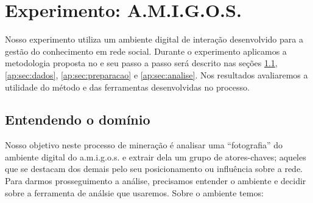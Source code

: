 \chapter{Experimento: A.M.I.G.O.S.}
\label{ap:estudo}

Nosso experimento utiliza um ambiente digital de interação desenvolvido para a
gestão do conhecimento em rede social. Durante o experimento aplicamos a
metodologia proposta no  e seu passo a passo será descrito nas
seções \ref{ap:sec:dominio}, \ref{ap:sec:dados}, \ref{ap:sec:preparacao} e
\ref{ap:sec:analise}. Nos resultados avaliaremos a utilidade do método e das
ferramentas desenvolvidas no processo.

\section{Entendendo o domínio}
\label{ap:sec:dominio}

Nosso objetivo neste processo de mineração é analisar uma ``fotografia'' do
ambiente digital do a.m.i.g.o.s. e extrair dela um grupo de atores-chaves;
aqueles que se destacam dos demais pelo seu posicionamento ou influência sobre a 
rede. Para darmos prosseguimento a análise, precisamos entender o ambiente e
decidir sobre a ferramenta de análsie que usaremos. Sobre o ambiente temos:


